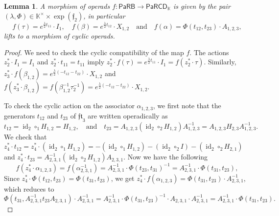 \documentclass{amsart}
\newcommand{\kk}{\mathbb{K}}    %
\newcommand{\PaRB}{\mathsf{PaRB}}
\newcommand{\PaRCD}{\mathsf{PaRCD}}
\newcommand{\hPaRCD}{{\PaRCD}_{\kk}}
\newcommand{\id}{\operatorname{id}}
\newcommand{\ff}{\mathfrak{f}}
\newtheorem{lemma}[theorem]{Lemma}%
\theoremstyle{definition}
\numberwithin{equation}{section}
\begin{document}
\begin{lemma}\label{lemma: maps PaRB to PaRCD}
A morphism of operads $f:\PaRB \rightarrow \hPaRCD$ is given by the pair $(\lambda, \Phi) \in \kk^{\times}\times \exp(\ff_2)$,
in particular
\[f(\tau)= e^{\frac{\lambda}{2} t_{11}} \cdot I_{1}, \quad f(\beta) = e^{\frac{\lambda}{2} t_{12}} \cdot X_{1,2} \quad \text{and} \quad f(\alpha) = \Phi(t_{12}, t_{23})\cdot A_{1,2,3},\] lifts to a morphism of cyclic operads. 
\end{lemma}

\begin{proof}
We need to check the cyclic compatibility of the map $f$. The actions $z^*_2 \cdot I_{1} = I_{1}$ and $z^*_2 \cdot t_{11} = t_{11}$ imply $z^*_2 \cdot f(\tau) = e^{\frac{\lambda}{2} t_{11}} \cdot I_{1} = f(z^*_2 \cdot \tau)$. Similarly, $z^*_3 \cdot f(\beta_{1,2}) = e^{\frac{\lambda}{2} (-t_{12}-t_{22})} \cdot X_{1,2}$ and $ f(z^*_3 \cdot \beta_{1,2}) = f(\beta_{1,2}^{-1} \tau_{2}^{-1}) = e^{\frac{\lambda}{2} (-t_{12}-t_{22})} \cdot X_{1,2}$. 

To check the cyclic action on the associator $\alpha_{1,2,3}$, we first note that the generators $t_{12}$ and $t_{23}$ of $\mathfrak{ft}_3$ are written operadically as \[t_{12} = \id_2\circ_1 H_{1,2} = H_{1,2}, \quad \text{and} \quad t_{23}  = A_{1,2,3}(\id_2 \circ_2 H_{1,2})A_{1,2,3}^{-1} = A_{1,2,3} H_{2,3} A_{1,2,3}^{-1}.\]
We check that $z^*_4 \cdot t_{12} = z^*_4 \cdot (\id_2\circ_1 H_{1,2}) = -(\id_2\circ_1 H_{1,2}) - (\id_2\circ_2 I) - (\id_2\circ_2 H_{2,1})$ and $z^*_4 \cdot t_{23} = A^{-1}_{2,3,1}(\id_2\circ_2 H_{1,2}) A_{2,3,1}$. Now we have the following \[f(z^*_4 \cdot \alpha_{1,2,3}) = f(\alpha_{2,3,1}^{-1}) = A^{-1}_{2,3,1} \cdot \Phi(t_{23},t_{31})^{-1} = A^{-1}_{2,3,1} \cdot \Phi(t_{31}, t_{23}),\] Since $z^*_4 \cdot \Phi(t_{12}, t_{23}) = \Phi(t_{31}, t_{23})$, we get $z^*_4 \cdot f(\alpha_{1,2,3}) = \Phi(t_{31}, t_{23})\cdot A_{2,3,1}^{-1}$, which reduces to \[\Phi( t_{31} , A^{-1}_{2,3,1} t_{23} A_{2,3,1} )\cdot A^{-1}_{2,3,1} = A^{-1}_{2,3,1} \cdot \Phi(t_{31},t_{23})^{-1}\cdot A_{2,3,1}\cdot A^{-1}_{2,3,1}  = A^{-1}_{2,3,1} \cdot \Phi(t_{31}, t_{23}).\]
\end{proof}
\end{document}
